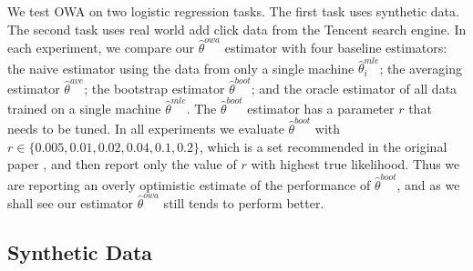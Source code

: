 \documentclass[twoside]{article}
\newcommand{\w}{\theta}
\newcommand{\wowa}{\hat\w^{owa}}
\newcommand{\wave}{\hat\w^{ave}}
\newcommand{\wboot}{\hat\w^{boot}}
\newcommand{\wmle}{\hat\w^{mle}}
\begin{document}
We test OWA on two logistic regression tasks.
The first task uses synthetic data.
The second task uses real world add click data from the Tencent search engine.
In each experiment, we compare our $\wowa$ estimator with four baseline estimators:
the naive estimator using the data from only a single machine $\wmle_i$;
the averaging estimator $\wave$;
the bootstrap estimator $\wboot$;
and the oracle estimator of all data trained on a single machine $\wmle$.
The $\wboot$ estimator has a parameter $r$ that needs to be tuned.
In all experiments we evaluate $\wboot$ with $r \in \{0.005,0.01,0.02,0.04,0.1,0.2\}$,
which is a set recommended in the original paper \citep{zhang2012communication},
and then report only the value of $r$ with highest true likelihood.
Thus we are reporting an overly optimistic estimate of the performance of $\wboot$,
and as we shall see our estimator $\wowa$ still tends to perform better.

\subsection{Synthetic Data}
\end{document}
